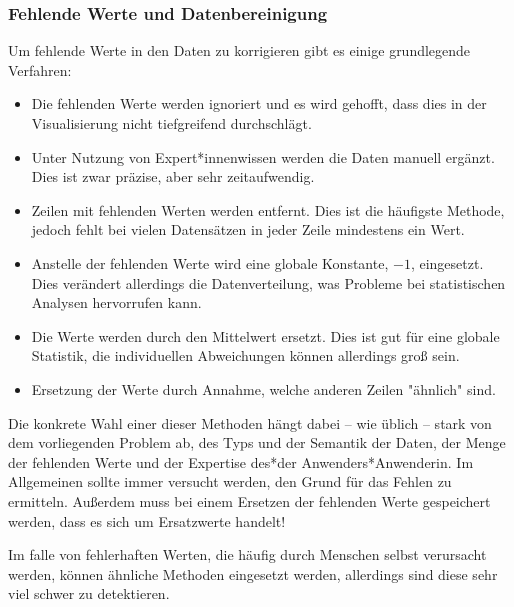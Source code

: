 			\subsubsection{Fehlende Werte und Datenbereinigung}
				Um fehlende Werte in den Daten zu korrigieren gibt es einige grundlegende Verfahren:
				\begin{itemize}
					\item {} Die fehlenden Werte werden ignoriert und es wird gehofft, dass dies in der Visualisierung nicht tiefgreifend durchschlägt.
					\item {} Unter Nutzung von Expert*innenwissen werden die Daten manuell ergänzt. Dies ist zwar präzise, aber sehr zeitaufwendig.
					\item {} Zeilen mit fehlenden Werten werden entfernt. Dies ist die häufigste Methode, jedoch fehlt bei vielen Datensätzen in jeder Zeile mindestens ein Wert.
					\item {} Anstelle der fehlenden Werte wird eine globale Konstante, \zB \(-1\), eingesetzt. Dies verändert allerdings die Datenverteilung, was Probleme bei statistischen Analysen hervorrufen kann.
					\item {} Die Werte werden durch den Mittelwert ersetzt. Dies ist gut für eine globale Statistik, die individuellen Abweichungen können allerdings groß sein.
					\item {} Ersetzung der Werte durch Annahme, welche anderen Zeilen "ähnlich" sind.
				\end{itemize}
				Die konkrete Wahl einer dieser Methoden hängt dabei -- wie üblich -- stark von dem vorliegenden Problem ab, \zB des Typs und der Semantik der Daten, der Menge der fehlenden Werte und der Expertise des*der Anwenders*Anwenderin. Im Allgemeinen sollte immer versucht werden, den Grund für das Fehlen zu ermitteln. Außerdem muss bei einem Ersetzen der fehlenden Werte gespeichert werden, dass es sich um Ersatzwerte handelt!

				Im falle von fehlerhaften Werten, die häufig durch Menschen selbst verursacht werden, können ähnliche Methoden eingesetzt werden, allerdings sind diese sehr viel schwer zu detektieren.

